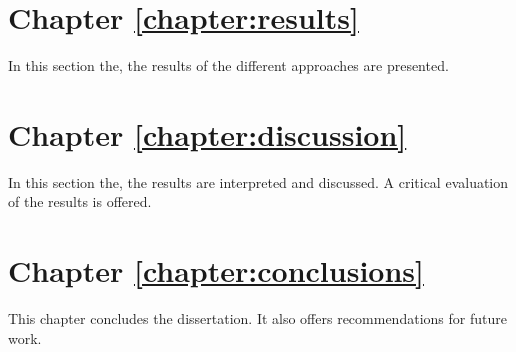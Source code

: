 \section*{Chapter \ref{chapter:results}}

In this section the, the results of the different approaches are presented.

\section*{Chapter \ref{chapter:discussion}}

In this section the, the results are interpreted and discussed. A critical evaluation of the results is offered.

\section*{Chapter \ref{chapter:conclusions}}

This chapter concludes the dissertation. It also offers recommendations for future work.
